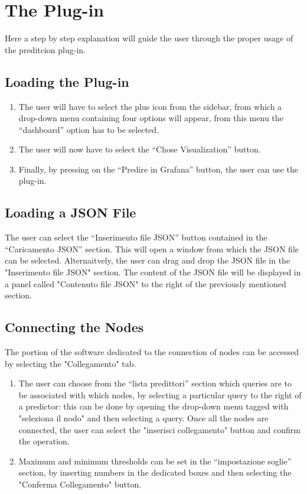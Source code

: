 \section{The Plug-in}
Here a step by step explanation will guide the user through the proper usage of the preditcion plug-in.

\subsection{Loading the Plug-in}
\begin{enumerate}
	\item The user will have to select the plus icon from the sidebar, from which a drop-down menu containing four options will appear, from this menu the “dashboard” option has to be selected.
	\item The user will now have to select the “Chose Visualization” button.
	\item Finally, by pressing on the “Predire in Grafana” button, the user can use the plug-in.
\end{enumerate}
	
\subsection{Loading a JSON File}
The user can select the “Inserimento file JSON” button contained in the “Caricamento JSON” section.
This will open a window from which the JSON file can be selected.
Alternaitvely, the user can drag and drop the JSON file in the "Inserimento file JSON" section.
The content of the JSON file will be displayed in a panel called "Contenuto file JSON" to the right of the previously mentioned section.


\subsection{Connecting the Nodes}
The portion of the software dedicated to the connection of nodes can be accessed by selecting the "Collegamento" tab.
\begin{enumerate}
	\item The user can choose from the “lista predittori” section which queries are to be associated with which nodes, by 
	selecting a particular query to the right of a predictor: this can be done by opening the drop-down menu tagged with "seleziona il nodo" and then selecting a query.
	Once all the nodes are connected, the user can select the "inserisci collegamento" button and confirm the operation.
	\item Maximum and minimum thresholds can be set in the “impostazione soglie” section, by inserting numbers in the dedicated boxes and then selecting the "Conferma Collegamento" button.
\end{enumerate}

